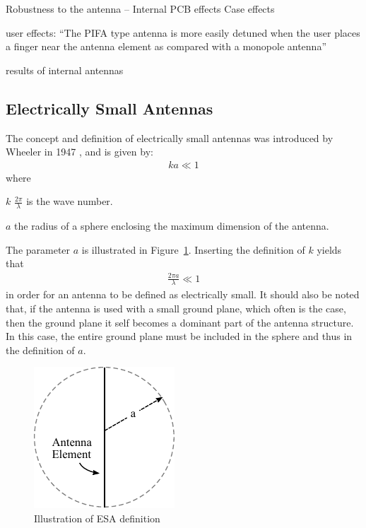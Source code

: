 Robustness to the antenna -- Internal
PCB effects
Case effects

user effects:
``The PIFA type antenna is more
easily detuned when the user places a finger near the antenna element as compared with
a monopole antenna''

results of internal antennas 
\cite{fujimoto2008mobile}

\subsection{Electrically Small Antennas}
\label{sec:elsmallantennas}
The concept and definition of electrically small antennas was introduced by Wheeler in 1947 \cite{wheeler1947}, and is given by:
\begin{align}
\label{eq:esa-def}
  ka \ll 1
\end{align}
where 
\begin{where}
\item[$k$] $\frac{2\pi}{\lambda}$ is the wave number. 
\item[$a$] the radius of a sphere enclosing the maximum dimension of the antenna. 
\end{where}
The parameter $a$ is illustrated in Figure~\ref{fig:ant-esa-def}. Inserting the definition of $k$ yields that
\begin{align}
  \frac{2\pi a}{\lambda} \ll 1
\end{align}
in order for an antenna to be defined as electrically small. It should also be noted that, if the antenna is used with a small ground plane, which often is the case, then the ground plane it self becomes a dominant part of the antenna structure. In this case, the entire ground plane must be included in the sphere and thus in the definition of $a$.

\begin{figure}[htbp]
  \centering
  \includegraphics[scale=1]{img/analysis/ESA}
  \caption{Illustration of ESA definition \cite{}}
  \label{fig:ant-esa-def}
\end{figure}

